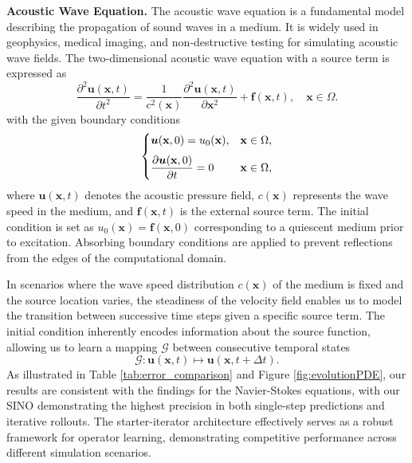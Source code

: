 \documentclass[preprint,numbers,sort&compress]{elsarticle}
\begin{document}
			
			
			
			\textbf{Acoustic Wave Equation.}
			The acoustic wave equation is a fundamental model describing the propagation of sound waves in a medium. It is widely used in geophysics, medical imaging, and non-destructive testing for simulating acoustic wave fields. The two-dimensional acoustic wave equation with a source term is expressed as
			\begin{equation*}
				\frac{\partial^2 \boldsymbol{u}(\mathbf{x},t)}{\partial t^2} 
				= \frac{1}{c^2(\mathbf{x})} 
				\frac{\partial^2 \boldsymbol{u}(\mathbf{x},t)}{\partial \mathbf{x}^2}  
				+ \boldsymbol{f}(\mathbf{x},t), \quad \mathbf{x} \in \Omega.
			\end{equation*}
			with the given boundary conditions
			\begin{equation*}
				\left\{
				\begin{array}{@{}l@{\quad}l@{}}
					\displaystyle
					\boldsymbol{u}(\mathbf{x}, 0) = u_0 (\mathbf{x}), & \mathbf{x} \in  \Omega,
					\\[1.6ex]
					\displaystyle
					\frac{\partial \boldsymbol{u}(\mathbf{x}, 0)}{\partial t} =0 & \mathbf{x} \in \Omega,
				\end{array}
				\right.
			\end{equation*}
			where \(\boldsymbol{u}(\mathbf{x},t)\) denotes the acoustic pressure field, \(c(\mathbf{x})\) represents the wave speed in the medium, and \(\boldsymbol{f}(\mathbf{x},t)\) is the external source term. The initial condition is set as \(u_0 (\mathbf{x}) = \boldsymbol{f}(\mathbf{x}, 0)\) corresponding to a quiescent medium prior to excitation. Absorbing boundary conditions are applied to prevent reflections from the edges of the computational domain.
			
			In scenarios where the wave speed distribution \(c(\mathbf{x})\) of the medium is fixed and the source location varies, the steadiness of the velocity field enables us to model the transition between successive time steps given a specific source term. The initial condition inherently encodes information about the source function, allowing us to learn a mapping \(\mathcal{G}\) between consecutive temporal states
			\[\mathcal{G}: \boldsymbol{u}(\mathbf{x},t) \mapsto \boldsymbol{u}(\mathbf{x},t+\Delta t).\] 
			As illustrated in Table \ref{tab:error_comparison} and Figure \ref{fig:evolutionPDE}, our results are consistent with the findings for the Navier-Stokes equations, with our SINO demonstrating the highest precision in both single-step predictions and iterative rollouts. 
			{The starter-iterator architecture effectively serves as a robust framework for operator learning, demonstrating competitive performance across different simulation scenarios.}
			
\end{document}
